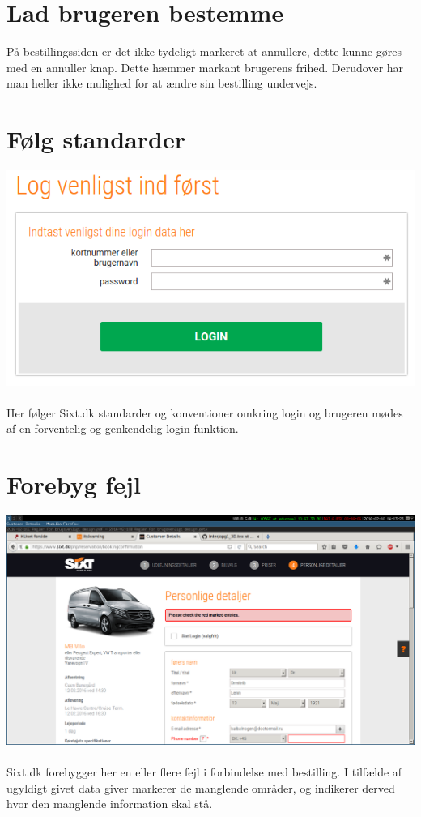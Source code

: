 \documentclass[12pt]{article}
\begin{document}
\newpage

\section{Lad brugeren bestemme}

På bestillingssiden er det ikke tydeligt markeret at annullere, dette kunne gøres med en annuller knap. Dette hæmmer markant brugerens frihed. Derudover har man heller ikke mulighed for at ændre sin bestilling undervejs. 


\section{Følg standarder}
\includegraphics[scale=0.5]{img/standard}
\\
\\
Her følger Sixt.dk standarder og konventioner omkring login og brugeren mødes af en forventelig og genkendelig login-funktion.

\newpage

\section{Forebyg fejl}
\includegraphics[scale=0.3]{img/CheckRedMarks}
\\
\\
Sixt.dk forebygger her en eller flere fejl i forbindelse med bestilling. I tilfælde af ugyldigt givet data giver markerer de manglende områder, og indikerer derved hvor den manglende information skal stå.
\\
\\
\end{document}
